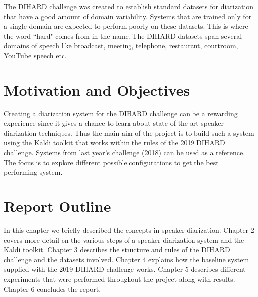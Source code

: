 The DIHARD challenge was created to establish standard datasets for diarization that have a good amount of domain variability. Systems that are trained only for a single domain are expected to perform poorly on these datasets. This is where the word ``hard" comes from in the name. The DIHARD datasets span several domains of speech like broadcast, meeting, telephone, restaurant, courtroom, YouTube speech etc.

\section{Motivation and Objectives}
Creating a diarization system for the DIHARD challenge can be a rewarding experience since it gives a chance to learn about state-of-the-art speaker diarization techniques. Thus the main aim of the project is to build such a system using the Kaldi toolkit \cite{povey2011kaldi} that works within the rules of the 2019 DIHARD challenge. Systems from last year's challenge (2018) can be used as a reference. The focus is to explore different possible configurations to get the best performing system.

\section{Report Outline}
In this chapter we briefly described the concepts in speaker diarization. Chapter 2 covers more detail on the various steps of a speaker diarization system and the Kaldi toolkit. Chapter 3 describes the structure and rules of the DIHARD challenge and the datasets involved. Chapter 4 explains how the baseline system supplied with the 2019 DIHARD challenge works. Chapter 5 describes different experiments that were performed throughout the project along with results. Chapter 6 concludes the report.